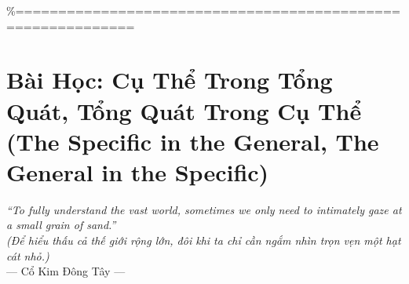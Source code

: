\%============================================================
\chapter{Bài Học: Cụ Thể Trong Tổng Quát, Tổng Quát Trong Cụ Thể (The Specific in the General, The General in the Specific)}
\begin{center}
  \textit{\color{truyengold}``To fully understand the vast world, sometimes we only need to intimately gaze at a small grain of sand.''}\\[4pt]
  \textit{(Để hiểu thấu cả thế giới rộng lớn, đôi khi ta chỉ cần ngắm nhìn trọn vẹn một hạt cát nhỏ.)}\\[4pt]
  \small\color{truyenblue}--- Cổ Kim Đông Tây ---
\end{center}
\ngancach

